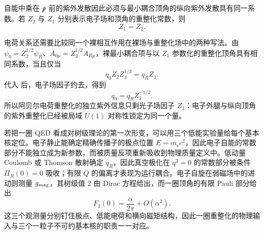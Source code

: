 自能中乘在 \(\slashed p\) 前的紫外发散因此必须与最小耦合顶角的纵向紫外发散具有同一系数。若 \(Z_2\) 与 \(Z_1\) 分别表示电子场和顶角的重整化常数，则
\begin{equation}
\boxed{Z_1=Z_2.}
\label{eq:qed-Z1-Z2-dp53}
\end{equation}

电荷关系还需要比较同一个裸相互作用在裸场与重整化场中的两种写法。由
\(\psi_0=Z_2^{1/2}\psi_R\)、\(A_{0\mu}=Z_3^{1/2}A_{R\mu}\)，裸最小耦合项与以 \(Z_1\) 参数化的重整化顶角具有相同系数，当且仅当
\begin{equation}
\boxed{
q_0 Z_2 Z_3^{1/2}=q_R Z_1.}
\label{eq:qed-bare-renormalized-charge-match-dp68}
\end{equation}
代入 后，电子场因子约去，得到
\begin{equation}
\boxed{q_0=q_RZ_3^{-1/2}.}
\label{eq:qed-charge-Z3-dp53}
\end{equation}
所以阿贝尔电荷重整化的独立紫外信息只剩光子场因子 \(Z_3\)：电子外腿与纵向顶角的紫外重整化已经被局域 \(U(1)\) 对称性锁定为同一个量。

若把一圈 QED 看成对树级理论的第一次形变，可以用三个低能实验量给每个基本核定位。电子静止能确定精确传播子的极点位置 \(E=m_{\mathrm e} c^2\)，因此电子自能的常数部分不能独立成为新参数，而被质量反项重新吸收到物理质量定义中。低动量 Coulomb 或 Thomson 散射确定 \(q_R\)，因此真空极化在 \(q^2=0\) 的常数部分被条件 \(\Pi_R(0)=0\) 吸收；有限 \(Q\) 的偏离才表现为运行耦合。电子自旋在弱磁场中的进动则测量 \(g_{\rm mag}\)，其树级值 \(2\) 由 Dirac 方程给出，而一圈顶角的有限 Pauli 部分给出
\[
F_2(0)=\frac{\alpha}{2\pi}+O(\alpha^2).
\]
这三个观测量分别钉住极点、低能电荷和横向磁矩结构，因此一圈重整化的物理输入与三个一粒子不可约基本核的职责一一对应。
